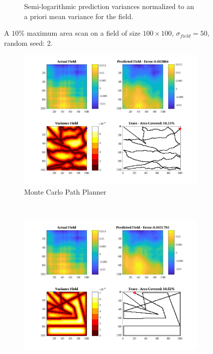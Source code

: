 \begin{figure}[htb!]
\begin{subfigure}[t]{0.65\textwidth}
        \captionsetup{skip=0.20\baselineskip,size=footnotesize}
        \caption{Semi-logarithmic prediction variances normalized to an a priori mean variance for the field.}
        \label{fig:prederrs_sigma50_p10_s2}
    \end{subfigure}
    \captionsetup{skip=0.20\baselineskip}
    \caption{A $10\%$ maximum area scan on a field of size $100 \times 100$, $\sigma_{field} = 50$, random seed: 2.}
    \label{fig:sigma50_p10_s2}
\end{figure}

\begin{figure}[htb!]
    \centering
    \begin{subfigure}[t]{0.5\textwidth}
        \centering
        \includegraphics[width=\linewidth]{figures/hbresults/mc_10p_100x100_sf_50_seed_2.png}
        \captionsetup{skip=0.10\baselineskip,size=footnotesize}
        \caption{Monte Carlo Path Planner}
    \end{subfigure}%
    ~ 
    \begin{subfigure}[t]{0.5\textwidth}
        \centering
        \includegraphics[width=\linewidth]{figures/hbresults/nhv_10p_100x100_sf_50_seed_2.png}

\end{subfigure}
\end{figure}
